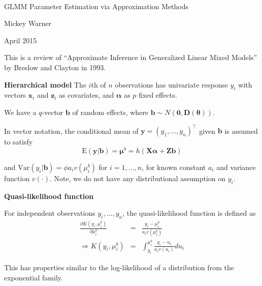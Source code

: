 \documentclass[mathserif, 11pt, t]{beamer}
\newcommand{\E}{\mathrm{E}}
\newcommand{\Var}{\mathrm{Var}}
\newcommand{\m}[1]{\mathbf{\bm{#1}}}
\renewcommand{\subtitle}[1]{\vspace{0.45cm}\textcolor{bluegreen}{
    {\textbf{#1}}}\vspace{0.15cm}\newline}
\begin{document}
\begin{center}
\ \\ [-0.5in]
\vfill
\bigskip
\bigskip
\bigskip
\bigskip
\bigskip

\begin{LARGE}
\begin{center}
GLMM Parameter Estimation via Approximation Methods
\end{center}
\end{LARGE}
\vfill

\begin{center}
Mickey Warner
\end{center}
\vfill
April 2015
\bigskip
\bigskip
\bigskip
\vfill
\ \\ [-0.5in]
\end{center}

\begin{frame}
\subtitle{}
This is a review of ``Approximate Inference in Generalized Linear Mixed Models'' by Breslow and Clayton in 1993.

\end{frame}

\begin{frame}
\subtitle{Hierarchical model}
The $i$th of $n$ observations has univariate response $y_i$ with vectors $\m{x}_i$ and $\m{z}_i$ as covariates, and $\m{\alpha}$ as $p$ fixed effects.
\bigskip

We have a $q$-vector $\m{b}$ of random effects, where $\m{b}\sim N(\m{0},\m{D}(\m{\theta}))$.
\bigskip

In vector notation, the conditional mean of $\m{y}=(y_1,\ldots,y_n)^\top$ given $\m{b}$ is assumed to satisfy
\[ \E(\m{y}|\m{b}) = \m{\mu}^b = h(\m{X}\m{\alpha} + \m{Z}\m{b}) \]

and $\Var(y_i|\m{b})=\phi a_iv(\mu_i^b)$ for $i=1,\ldots,n$, for known constant $a_i$ and variance function $v(\cdot)$. Note, we do not have any distributional assumption on $y_i$.

\end{frame}

\begin{frame}
\subtitle{Quasi-likelihood function}

For independent observations $y_i,\ldots,y_n$, the quasi-likelihood function is defined as
\begin{eqnarray*}
\frac{\partial K(y_i, \mu_i^b)}{\partial \mu_i^b} &=& \frac{y_i-\mu_i^b}{a_i v(\mu_i^b)} \\
\Longrightarrow K(y_i,\mu_i^b)&=&\int_{y_i}^{\mu_i^b}\frac{y_i-u_i}{a_i v(u_i)}du_i
\end{eqnarray*}

This has properties similar to the log-likelihood of a distribution from the exponential family.


\end{frame}
\end{document}

